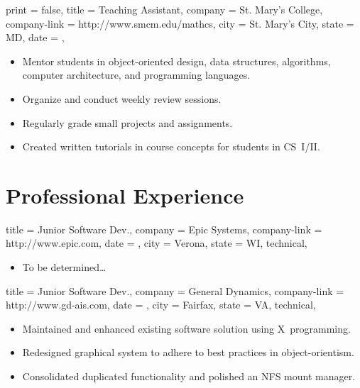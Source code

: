 \documentclass{simplecv}
\begin{document}
\begin{position}
  {
    print   = false,
    title   = Teaching Assistant,
    company = St. Mary's College,
    company-link = http://www.smcm.edu/mathcs,
    city    = St. Mary's City,
    state   = MD,
    date    = ,
  }

\begin{itemize}
\item Mentor students in object-oriented design, data structures, algorithms, computer architecture, and programming languages.
\item Organize and conduct weekly review sessions.
\item Regularly grade small projects and assignments.
\item Created written tutorials in course concepts for students in CS~I\slash II.
\end{itemize}
\end{position}

\vfill\vfill
\section{Professional Experience}

\begin{position}
  {
    title   = Junior Software Dev.,
    company = Epic Systems,
    company-link = http://www.epic.com,
    date    = ,
    city    = Verona,
    state   = WI,
    technical,
  }

\begin{itemize}
\item To be determined\dots
\end{itemize}
\end{position}

\begin{position}
  {
    title   = Junior Software Dev.,
    company = General Dynamics,
    company-link = http://www.gd-ais.com,
    date    = ,
    city    = Fairfax,
    state   = VA,
    technical,
  }

\begin{itemize}
\item Maintained and enhanced existing software solution using X~programming.
\item Redesigned graphical system to adhere to best practices in object-orientism.
\item Consolidated duplicated functionality and polished an NFS mount manager.
\end{itemize}
\end{position}
\end{document}

